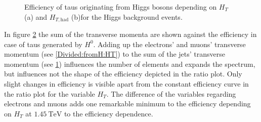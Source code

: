 \begin{figure}
\begin{subfigure}[t]{0.49\textwidth}
                \label{Divided:fromH:HThad}
                \end{subfigure}
\caption[Efficiency of taus originating from Higgs bosons for the Higgs background events.]{Efficiency of taus originating from Higgs bosons depending on $H_{T}$ (a) and $H_{T,\text{had}}$ (b)for the Higgs background events.}
\label{Divided:fromH:HTgedöns}
\end{figure}
%
In figure \ref{Divided:fromH:HTgedöns} the sum of the transverse momenta are shown against the efficiency in case of taus generated by $H^0$. Adding up the electrons' and muons' transverse momentum (see \ref{Divided:fromH:HT}) to the sum of the jets' transverse momentum (see \ref{Divided:fromH:HThad}) influences the number of elements and expands the spectrum, but influences not the shape of the efficiency depicted in the ratio plot. Only slight changes in efficiency is visible apart from the constant efficiency curve in the ratio plot for the variable $H_T$. The difference of the variables regarding electrons and muons adds one remarkable minimum to the efficiency depending on $H_T$ at $\SI{1.45}{\tera\electronvolt}$ to the efficiency dependence.\newline
%
%
